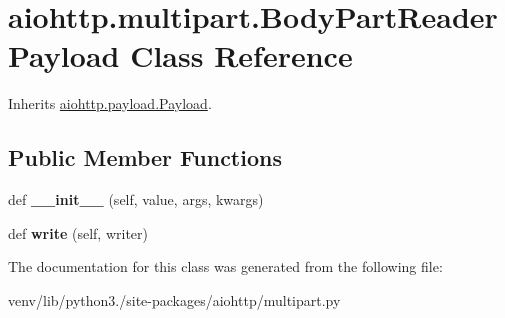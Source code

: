 \hypertarget{classaiohttp_1_1multipart_1_1_body_part_reader_payload}{}\section{aiohttp.\+multipart.\+Body\+Part\+Reader\+Payload Class Reference}
\label{classaiohttp_1_1multipart_1_1_body_part_reader_payload}


Inherits \hyperlink{classaiohttp_1_1payload_1_1_payload}{aiohttp.\+payload.\+Payload}.

\subsection*{Public Member Functions}
\begin{DoxyCompactItemize}
\item 
\mbox{\label{classaiohttp_1_1multipart_1_1_body_part_reader_payload_afaf419a54eb952019f899c3894c8ae39}} 
def {\bfseries \+\_\+\+\_\+init\+\_\+\+\_\+} (self, value, args, kwargs)
\item 
\mbox{\label{classaiohttp_1_1multipart_1_1_body_part_reader_payload_ab451aa83e50d428468d91e1caa7869e5}} 
def {\bfseries write} (self, writer)
\end{DoxyCompactItemize}


The documentation for this class was generated from the following file\+:\begin{DoxyCompactItemize}
\item 
venv/lib/python3./site-\/packages/aiohttp/multipart.\+py\end{DoxyCompactItemize}
